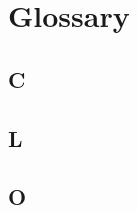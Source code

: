 


\chapter{Glossary}
\label{glossary:cha}

\section*{C}
\begin{multicols}{2}

\end{multicols}

\section*{L}
\begin{multicols}{2}

\end{multicols}

\section*{O}
\begin{multicols}{2}

\end{multicols}

